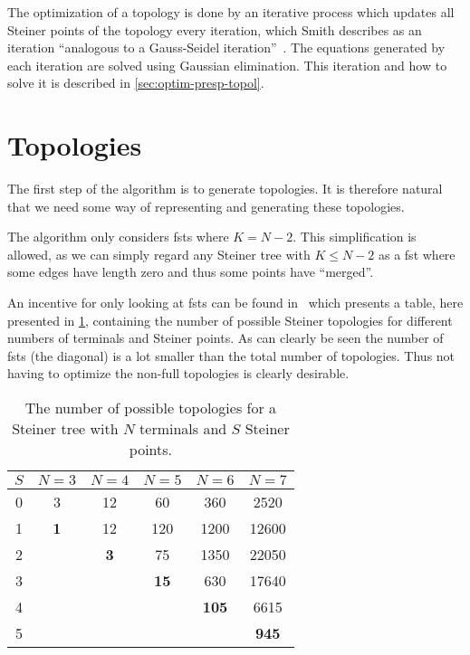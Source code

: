 The optimization of a topology is done by an iterative process which updates all
Steiner points of the topology every iteration, which Smith describes as an
iteration ``analogous to a Gauss-Seidel iteration''~\cite[p.~145]{smith1992}.
The equations generated by each iteration are solved using Gaussian
elimination. This iteration and how to solve it is described in
\cref{sec:optim-presp-topol}.

\section{Topologies}
\label{sec:topologies}

The first step of the algorithm is to generate topologies. It is therefore
natural that we need some way of representing and generating these topologies.

The algorithm only considers \glspl{fst} where $K = N - 2$. This simplification
is allowed, as we can simply regard any Steiner tree with $K \le N - 2$ as a
\gls{fst} where some edges have length zero and thus some points have
``merged''.

An incentive for only looking at \glspl{fst} can be found in~\cite{gilbert1968}
which presents a table, here presented in \cref{tab:number-of-topologies},
containing the number of possible Steiner topologies for different numbers of
terminals and Steiner points. As can clearly be seen the number of \glspl{fst}
(the diagonal) is a lot smaller than the total number of topologies. Thus not
having to optimize the non-full topologies is clearly desirable.

\begin{table}[htbp]
  \centering
  \begin{tabular}{cccccc}
    \toprule
    $S$ & $N = 3$    & $N = 4$    & $N = 5$     & $N = 6$      & $N = 7$      \\
    \midrule
    0   & 3          & 12         & 60          & 360          & 2520         \\
    1   & \textbf{1} & 12         & 120         & 1200         & 12600        \\
    2   &            & \textbf{3} & 75          & 1350         & 22050        \\
    3   &            &            & \textbf{15} & 630          & 17640        \\
    4   &            &            &             & \textbf{105} & 6615         \\
    5   &            &            &             &              & \textbf{945} \\
    \bottomrule
  \end{tabular}
  \caption[Number of possible topologies]{The number of possible topologies for a Steiner tree with $N$
    terminals and $S$ Steiner points.\label{tab:number-of-topologies}}
\end{table}

